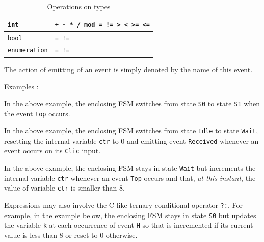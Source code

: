 \begin{table}
\begin{minipage}[c]{1.0\linewidth}
\small
\begin{center}
\begin{tabular}{|l|l|} \hline
{\tt int}       & {\tt + - * / mod = != > < >= <=} \\  \hline
{\tt bool}      & {\tt = !=} \\ \hline 
{\tt enumeration}     & {\tt = !=} \\  \hline
\end{tabular}
\caption{Operations on types}
\label{tab:type-ops}
\end{center}
\end{minipage}
\end{table}

\medskip
The action of emitting of an event  is simply denoted by the name of this event.

\medskip
Examples :

\begin{center}
\end{center}

In the above example, the enclosing FSM switches from state \verb|S0| to state \verb|S1| when the
event \verb|top| occurs. 

\begin{center}
\end{center}

In the above example, the enclosing FSM switches from state \verb|Idle| to state \verb|Wait|, resetting the internal variable
  \verb|ctr| to 0 and emitting event \verb|Received| whenever an event occurs on its \verb|Clic| input.

\begin{center}
\end{center}

In the above example, the enclosing FSM stays in state \verb|Wait| but increments the internal
variable \verb|ctr| whenever an event \verb|Top| occurs and that, \emph{at this instant}, the
value of variable \verb|ctr| is smaller than 8. 

\medskip
Expressions may also involve the C-like ternary conditional operator \verb|?:|.
For example, in the example below, the enclosing FSM stays in state \verb|S0| but updates the variable \verb|k|
at each occurrence of event \verb|H| so that is incremented if its current value is less than 8 or
reset to 0 otherwise.

